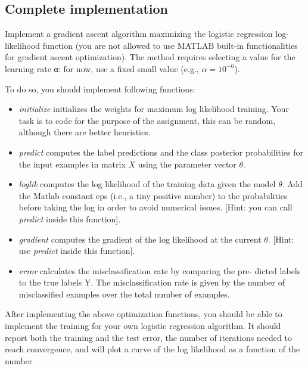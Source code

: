 \documentclass[12pt]{article}
\newenvironment{problem}[2][Problem:]{\begin{trivlist}
\item[\hskip \labelsep {\bfseries #1}\hskip \labelsep {\bfseries #2.}]}{\end{trivlist}}
\begin{document}
\subsection{Complete implementation}
\begin{problem}{Programming: gradient ascent [13 points]}
Implement a gradient ascent algorithm maximizing the logistic regression log-likelihood function (you are not allowed to use MATLAB built-in functionalities for gradient ascent optimization). The method requires selecting a value for the learning rate α: for now, use a fixed small value (e.g., $\alpha = 10^{−6}$).

To do so, you should implement following functions:
\begin{itemize}
\item \textit{initialize} initializes the weights for maximum log likelihood training. Your task is to code for the purpose of the assignment, this can be random, although there are better heuristics.
\item \textit{predict} computes the label predictions and the class posterior probabilities for the input examples in matrix $X$ using the parameter vector $\theta$.

\item \textit{loglik} computes the log likelihood of the training data given the model $\theta$. Add the Matlab constant eps (i.e., a tiny positive number) to the probabilities before taking the log in order to avoid numerical issues. [Hint: you can call \textit{predict} inside this function].

\item \textit{gradient} computes the gradient of the log likelihood at the current $\theta$. [Hint: use \textit{predict} inside this function].

\item \textit{error} calculates the misclassification rate by comparing the pre- dicted labels to the true labels Y. The misclassification rate is given by the number of misclassified examples over the total number of examples.
\end{itemize}

After implementing the above optimization functions, you should be able to implement the training for your own logistic regression algorithm. It should report both the training and the test error, the number of iterations needed to reach convergence, and will plot a curve of the log likelihood as a function of the number
\end{problem}
\end{document}
